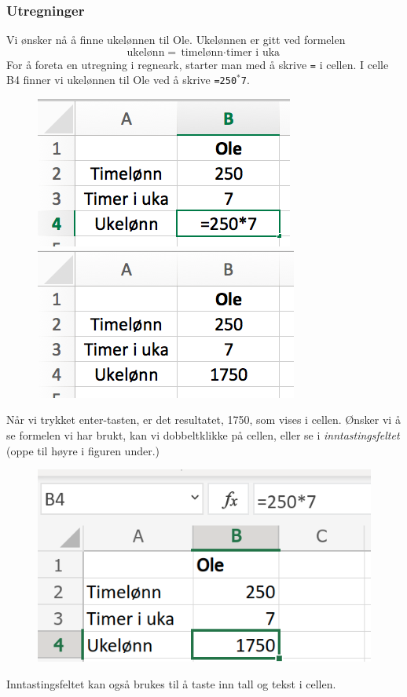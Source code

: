\subsubsection{Utregninger}
Vi ønsker nå å finne ukelønnen til Ole.
Ukelønnen er gitt ved formelen
\[ \text{ukelønn}={\text{timelønn}\cdot \text{timer i uka}} \]
For å foreta en utregning i regneark, starter man med å skrive {\tt{=}} i cellen. I celle B4 finner vi ukelønnen til Ole ved å skrive {\tt=250$ ^* $7}.
\begin{figure}[H]
	\centering
	\includegraphics[scale=0.3]{figs/ex3}\qquad
	\includegraphics[scale=0.3]{figs/ex4}
\end{figure}
Når vi trykket enter-tasten, er det resultatet, 1750, som vises i cellen. Ønsker vi å se formelen vi har brukt, kan vi dobbeltklikke på cellen, eller se i \textit{inntastingsfeltet} (oppe til høyre i figuren under.)
\begin{figure}[H]
	\centering
	\includegraphics[scale=0.25]{figs/intast}
\end{figure}
\mer Inntastingsfeltet kan også brukes til å taste inn tall og tekst i cellen.

